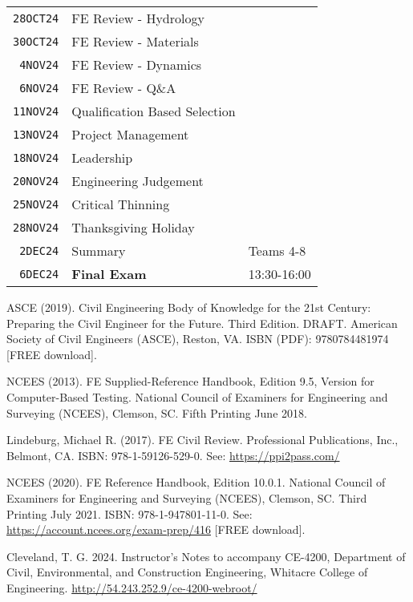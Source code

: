 \documentclass[12pt]{article}
\begin{document}
\begin{table}[ht!]
\begin{tabular}{p{0.5in}p{3.0in}p{3.0in}}
\texttt{28OCT24} & FE Review - Hydrology &\\ %
\texttt{30OCT24} & FE Review - Materials & \\ %
\texttt{~4NOV24} & FE Review - Dynamics &  \\ %
\texttt{~6NOV24} & FE Review - Q\&A  &  \\ %
\texttt{11NOV24} & Qualification Based Selection &  \\ %
\texttt{13NOV24} & Project Management &  \\ %
\texttt{18NOV24} & Leadership &  \\ %
\texttt{20NOV24} & Engineering Judgement &  \\ %
\texttt{25NOV24} & Critical Thinning &  \\ %
\texttt{28NOV24} & Thanksgiving Holiday &    \\ %
\texttt{~2DEC24} & Summary & Teams 4-8 \\ %
\texttt{~6DEC24} & \textbf{Final Exam} & 13:30-16:00 \\ %
\hline
   \end{tabular}
   \label{tab:fall2013schedule}
\end{table}


\clearpage



\begin{thebibliography}{}

ASCE (2019). Civil Engineering Body of Knowledge for the 21st Century: Preparing the Civil
Engineer for the Future. Third Edition. DRAFT. American Society of Civil Engineers (ASCE),
Reston, VA. ISBN (PDF): 9780784481974 [FREE download].

NCEES (2013). FE Supplied-Reference Handbook, Edition 9.5, Version for Computer-Based
Testing. National Council of Examiners for Engineering and Surveying (NCEES), Clemson,
SC. Fifth Printing June 2018.

Lindeburg, Michael R. (2017). FE Civil Review. Professional Publications, Inc., Belmont,
CA. ISBN: 978-1-59126-529-0. See: \url{https://ppi2pass.com/}

NCEES (2020). FE Reference Handbook, Edition 10.0.1. National Council of Examiners for
Engineering and Surveying (NCEES), Clemson, SC. Third Printing July 2021. ISBN: 978-1-947801-11-0.
See: \url{https://account.ncees.org/exam‐prep/416} [FREE download].

Cleveland, T. G. 2024. Instructor's Notes to accompany CE-4200, Department of Civil, Environmental, and Construction Engineering, Whitacre College of Engineering. \url{http://54.243.252.9/ce-4200-webroot/}

\end{thebibliography}
\end{document}
